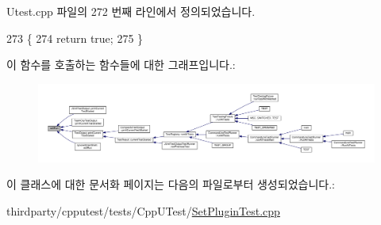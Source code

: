 Utest.\+cpp 파일의 272 번째 라인에서 정의되었습니다.


\begin{DoxyCode}
273 \{
274     \textcolor{keywordflow}{return} \textcolor{keyword}{true};
275 \}
\end{DoxyCode}


이 함수를 호출하는 함수들에 대한 그래프입니다.\+:
\nopagebreak
\begin{figure}[H]
\begin{center}
\leavevmode
\includegraphics[width=350pt]{class_utest_shell_afa35d9bf0fd1c772b04f48d89d318a70_icgraph}
\end{center}
\end{figure}




이 클래스에 대한 문서화 페이지는 다음의 파일로부터 생성되었습니다.\+:\begin{DoxyCompactItemize}
\item 
thirdparty/cpputest/tests/\+Cpp\+U\+Test/\hyperlink{_set_plugin_test_8cpp}{Set\+Plugin\+Test.\+cpp}\end{DoxyCompactItemize}
